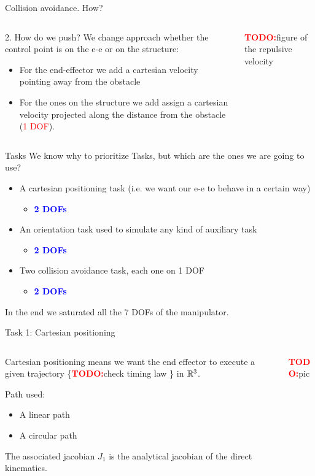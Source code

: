 \documentclass[11pt]{beamer}
\newcommand{\todo}{\textcolor{red}{\textbf{TODO:}}}
\newcommand{\dof}[1]{\begin{itemize}
\item[-]\textcolor{blue}{\textbf{#1 DOFs}}
\end{itemize}}
\begin{document}
\begin{frame}{Collision avoidance. How?}
\begin{columns}
\begin{column}{.5\textwidth}
\begin{block}{2. How do we push?}
We change approach whether the control point is on the e-e or on the structure:
\begin{itemize}
\item For the end-effector we add a cartesian velocity pointing away from the obstacle
\item For the ones on the structure we add assign a cartesian velocity projected along the distance from the obstacle (\textcolor{red}{1 DOF}).
\end{itemize}
\end{block}
\end{column}
\begin{column}{.5\textwidth}
\todo figure of the repulsive velocity
\end{column}
\end{columns}
\end{frame}

\begin{frame}{Tasks}
We know why to prioritize Tasks, but which are the ones we are going to use?
\begin{itemize}
\item[\textbf{1}] A cartesian positioning task (i.e. we want our e-e to behave in a certain way)
\dof{2}
\item[\textbf{2}] An orientation task used to simulate any kind of auxiliary task
\dof{2}
\item[\textbf{3,4}] Two collision avoidance task, each one on 1 DOF
\dof{2}
\end{itemize}
In the end we saturated all the 7 DOFs of the manipulator.
\end{frame}

\begin{frame}{Task 1: Cartesian positioning}
\begin{columns}
\begin{column}{.5\textwidth}
Cartesian positioning means we want the end effector to execute a given trajectory \{\todo check timing law \} in $\Bbb R^3$.

\begin{block}{Path used:}
\begin{itemize}
\item A linear path
\item A circular path 
\end{itemize}
\end{block}

The associated jacobian $J_1$ is the analytical jacobian of the direct kinematics.
\end{column}
\begin{column}{.5\textwidth}
\todo pic
\end{column}
\end{columns}
\end{frame}
\end{document}
